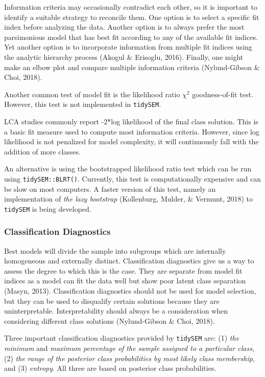 \documentclass[
  ,man,floatsintext]{apa6}
\begin{document}
Information criteria may occasionally contradict each other,
so it is important to identify a suitable strategy to reconcile them.
One option is to select a specific fit index before analyzing the data.
Another option is to always prefer
the most parsimonious model that has best fit
according to any of the available fit indices.
Yet another option is to incorporate information from
multiple fit indices using the analytic hierarchy process
(Akogul \& Erisoglu, 2016).
Finally, one might make an elbow plot and
compare multiple information criteria
(Nylund-Gibson \& Choi, 2018).

Another common test of model fit is
the likelihood ratio \(\chi^2\) goodness-of-fit test.
However, this test is not implemented in \texttt{tidySEM}.

LCA studies commonly report -2*log likelihood of the final class solution.
This is a basic fit measure used to compute most information criteria.
However, since log likelihood is not penalized for model complexity,
it will continuously fall with the addition of more classes.

An alternative is using the bootstrapped likelihood ratio test
which can be run using \texttt{tidySEM::BLRT()}.
Currently, this test is computationally expensive and
can be slow on most computers.
A faster version of this test,
namely an implementation of \emph{the lazy bootstrap} (Kollenburg, Mulder, \& Vermunt, 2018)
to \texttt{tidySEM} is being developed.

\hypertarget{classification-diagnostics}{%
\subsubsection{Classification Diagnostics}\label{classification-diagnostics}}

Best models will divide the sample into subgroups
which are internally homogeneous and externally distinct.
Classification diagnostics give us a way to assess
the degree to which this is the case.
They are separate from model fit indices as
a model can fit the data well
but show poor latent class separation (Masyn, 2013).
Classification diagnostics should not be used for model selection,
but they can be used to disqualify certain solutions
because they are uninterpretable.
Interpretability should always be a consideration
when considering different class solutions (Nylund-Gibson \& Choi, 2018).

Three important classification diagnostics provided by \texttt{tidySEM} are:
(1) \emph{the minimum} and \emph{maximum percentage of the sample assigned to a particular class},
(2) \emph{the range of the posterior class probabilities by most likely class membership},
and (3) \emph{entropy}.
All three are based on posterior class probabilities.
\end{document}
